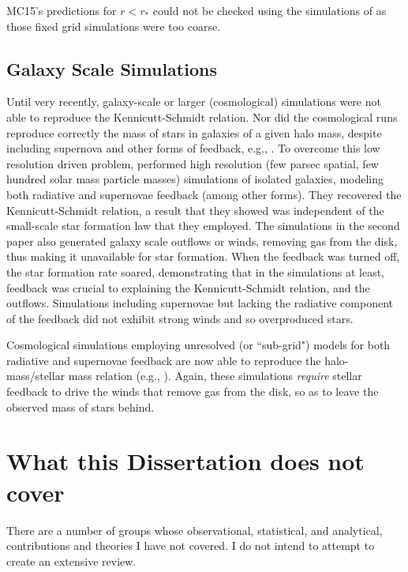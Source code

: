 \documentclass[../dissertation.tex]{subfiles}
\begin{document}
MC15's predictions for $r<r_*$ could not be checked using the simulations
of \citet{2015ApJ...800...49L} as those fixed grid simulations were
too coarse.  


\subsection {Galaxy Scale Simulations}

Until very recently, galaxy-scale or larger (cosmological) simulations 
were not able to reproduce the Kennicutt-Schmidt relation. 
Nor did the cosmological runs reproduce correctly the mass of stars in galaxies of a given 
halo mass, despite including supernova and other forms of feedback, 
e.g., \citet{2010MNRAS.404.1111G,2010Natur.463..203G,2011MNRAS.410.2625P}.
To overcome this low resolution driven problem, \citet{2011MNRAS.417..950H,2012MNRAS.421.3522H}
performed high resolution (few parsec spatial, few hundred solar mass particle masses) simulations 
of isolated galaxies, modeling both radiative and supernovae feedback (among other forms). 
They recovered the Kennicutt-Schmidt relation, a result that they 
showed was independent of the small-scale star formation
law that they employed. 
The simulations in the second paper also generated galaxy 
scale outflows or winds, removing gas from the disk, thus making it unavailable for star 
formation. 
When the feedback was turned off, the star formation rate soared, demonstrating that
in the simulations at least, feedback was crucial to explaining the Kennicutt-Schmidt relation, and
the outflows. 
Simulations including supernovae but lacking the radiative component of the feedback
did not exhibit strong winds and so overproduced stars.

Cosmological simulations employing unresolved (or ``sub-grid") models for both 
radiative and supernovae feedback are now able to reproduce the halo-mass/stellar mass relation (e.g.,
\citealt{2013MNRAS.434.3142A,2014MNRAS.445..581H,2015ApJ...804...18A}). Again, 
these simulations {\em require} 
stellar feedback to drive the winds that remove gas from the disk, so as to leave the observed mass of stars behind. 


\section{What this Dissertation does not cover}
There are a number of groups whose observational, statistical, and analytical, contributions and theories I have not covered.
I do not intend to attempt to create an extensive review.
\end{document}
